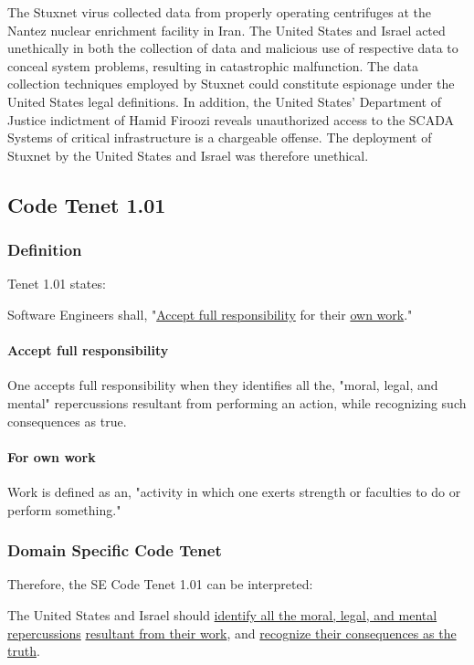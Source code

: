 \documentclass[12pt]{article}
\begin{document}
\begin{multicols}{2}
The Stuxnet virus collected data from properly operating centrifuges at the Nantez nuclear enrichment facility in Iran. The United States and Israel acted unethically in both the collection of data and malicious use of respective data to conceal system problems, resulting in catastrophic malfunction. The data collection techniques employed by Stuxnet could constitute espionage under the United States legal definitions. In addition, the United States' Department of Justice indictment of Hamid Firoozi reveals unauthorized access to the SCADA Systems of critical infrastructure is a chargeable offense. The deployment of Stuxnet by the United States and Israel was therefore unethical.


\subsection{Code Tenet 1.01}

\subsubsection{Definition}

Tenet 1.01 states:
\begin{framed}
Software Engineers shall, "\underline{Accept full responsibility} for their \underline{own work}."\cite{softwareEngineeringCodeOfEthics}
\end{framed}

\paragraph{Accept full responsibility}
One accepts full responsibility when they identifies all the, "moral, legal, and mental" repercussions resultant from performing an action, while recognizing such consequences as true.\cite{acceptDefinition}\cite{responsibilityDefinition}

\paragraph{For own work}
Work is defined as an, "activity in which one exerts strength or faculties to do or perform something."\cite{workDefinition}

\subsubsection{Domain Specific Code Tenet}

Therefore, the SE Code Tenet 1.01 can be interpreted:
\begin{framed}
The United States and Israel should \ul{identify all the moral, legal, and mental repercussions} \ul{resultant from their work}, and \ul{recognize their consequences as the truth}.
\end{framed}


\end{multicols}
\end{document}
